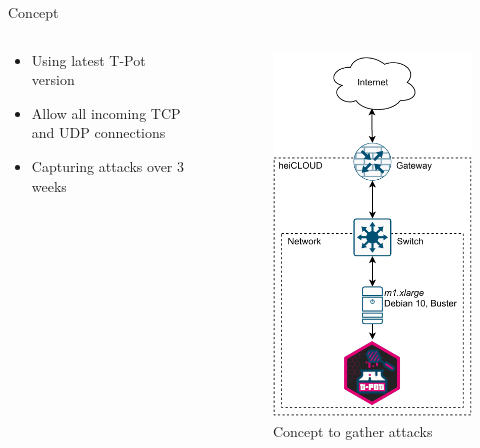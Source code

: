 \begin{frame}{Concept}
    \begin{columns}
        \begin{column}{0.5\textwidth}
            \begin{itemize}
                \item Using latest T-Pot version
                \item Allow all incoming TCP and UDP connections
                \item Capturing attacks over 3 weeks
            \end{itemize}
        \end{column}
        \begin{column}{.02\textwidth}
            \rule{.1mm}{0.7\textheight}
        \end{column}
        \begin{column}{0.5\textwidth}
            \begin{figure}
                \centering
                \includegraphics[width=0.7\columnwidth]{img/tpot-concept.pdf}
                \caption{Concept to gather attacks}
            \end{figure}
        \end{column}
    \end{columns}
\end{frame}

